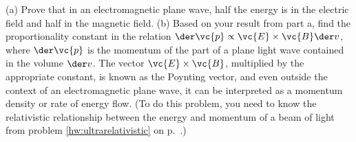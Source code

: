         (a) Prove that in an electromagnetic plane wave, half the energy
        is in the electric field and half in the magnetic field.\hwendpart
(b) Based on your result from part a, find the proportionality
constant in the relation $\der\vc{p}\propto\vc{E}\times\vc{B}\der v$,
where $\der \vc{p}$ is the momentum of the part of a plane light wave
contained in the volume $\der v$. The vector $\vc{E}\times\vc{B}$,
multiplied by the appropriate constant, is known as the Poynting
vector, and even outside the context of an electromagnetic plane wave,
it can be interpreted as a momentum density or rate of
energy flow. (To do this problem, you need to know the relativistic
relationship between the energy and momentum of a beam of
light from problem \ref{hw:ultrarelativistic} on p.~\pageref{hw:ultrarelativistic}.)\answercheck
